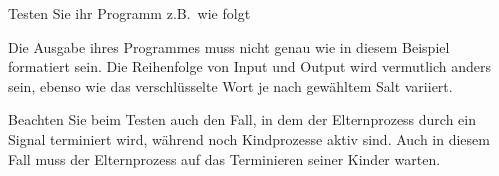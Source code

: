 Testen Sie ihr Programm z.B.\ wie folgt


Die Ausgabe ihres Programmes muss nicht genau wie in diesem Beispiel
formatiert sein. Die Reihenfolge von Input und Output wird vermutlich
anders sein, ebenso wie das verschlüsselte Wort je nach gewähltem Salt
variiert.

Beachten Sie beim Testen auch den Fall, in dem der Elternprozess durch
ein Signal terminiert wird, während noch Kindprozesse aktiv sind. Auch
in diesem Fall muss der Elternprozess auf das Terminieren seiner Kinder
warten.

\osueguidelinestwo


